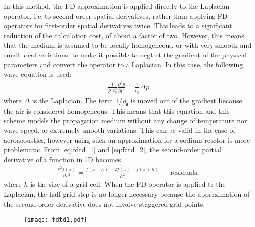         In this method, the FD approximation is applied directly to the Laplacian operator, i.e. to second-order spatial derivatives,
rather than applying FD operators for first-order spatial derivatives twice. This leads to a significant reduction of the calculation cost, of about a factor of two.
However, this means that the medium is assumed to be locally homogeneous, or with very smooth and small local variations, to make it possible to neglect the gradient of the
physical parameters and convert the operator to a Laplacian.
In this case, the following wave equation is used:
            \begin{align} \label{eq:fdtd_22}
                \frac{1}{\rho_0 c_0^2}\frac{\partial^2 p}{\partial t^2}= \frac{1}{\rho_0}\Delta p
            \end{align}
            where $\Delta$ is the Laplacian. The term $1/\rho_0$ is moved out of the gradient because the air is considered homogeneous.
This means that this equation and this scheme models the
propagation medium without any change of temperature nor wave speed, or extremely smooth variations.
This can be valid in the case of aeroacoustics, however using such an approximation for a sodium reactor is more problematic.
            From \ref{eq:fdtd_1} and \ref{eq:fdtd_2}, the second-order partial derivative of a function in 1D becomes
            \begin{align} \label{eq:fdtd_23}
                \frac{\partial^2 f(x)}{\partial x^2} = \frac{f(x-h)-2f(x)+f(x+h)}{h^2} \mathrm{ \ + \ residuals},
            \end{align}
            where $h$ is the size of a grid cell. When the FD operator is applied to the Laplacian, the half grid step is no longer necessary because the approximation
of the second-order derivative does not involve staggered grid points.

            \begin{figure}[htbp]
                     \centerline{\texttt{[image: fdtd1.pdf]}}
                \label{fig:b1}
             \end{figure}

